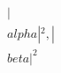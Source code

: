 \documentclass[preview]{standalone}
\begin{document}
\begin{align*}
|\\alpha|^2, |\\beta|^2
\end{align*}
\end{document}
